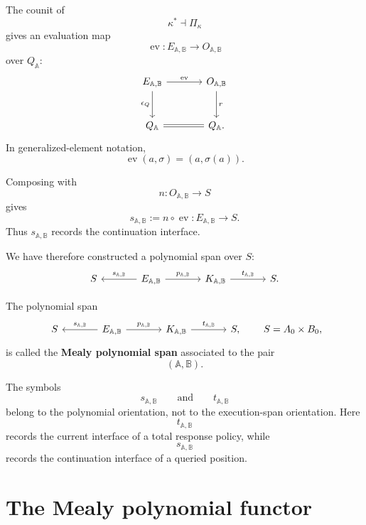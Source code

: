 The counit of
\[
\kappa^\ast\dashv\Pi_\kappa
\]
gives an evaluation map
\[
\operatorname{ev}:E_{\mathbb A,\mathbb B}\to O_{\mathbb A,\mathbb B}
\]
over \(Q_{\mathbb A}\):
\[
\begin{tikzcd}[column sep=large,row sep=large]
E_{\mathbb A,\mathbb B}
  \arrow[r, "\operatorname{ev}"]
  \arrow[d, "\epsilon_Q"']
&
O_{\mathbb A,\mathbb B}
  \arrow[d, "r"]
\\
Q_{\mathbb A}
  \arrow[r, equal]
&
Q_{\mathbb A}.
\end{tikzcd}
\]
In generalized-element notation,
\[
\operatorname{ev}(a,\sigma)=(a,\sigma(a)).
\]

Composing with
\[
n:O_{\mathbb A,\mathbb B}\to S
\]
gives
\[
s_{\mathbb A,\mathbb B}
:=
n\circ\operatorname{ev}
:
E_{\mathbb A,\mathbb B}\to S.
\]
Thus \(s_{\mathbb A,\mathbb B}\) records the continuation interface.

We have therefore constructed a polynomial span over \(S\):
\[
\begin{tikzcd}[column sep=large]
S
&
E_{\mathbb A,\mathbb B}
  \arrow[l, "s_{\mathbb A,\mathbb B}"']
  \arrow[r, "p_{\mathbb A,\mathbb B}"]
&
K_{\mathbb A,\mathbb B}
  \arrow[r, "t_{\mathbb A,\mathbb B}"]
&
S .
\end{tikzcd}
\]

\begin{definition}
\label{def:mealy-polynomial-span}
The polynomial span
\[
\begin{tikzcd}[column sep=large]
S
&
E_{\mathbb A,\mathbb B}
  \arrow[l, "s_{\mathbb A,\mathbb B}"']
  \arrow[r, "p_{\mathbb A,\mathbb B}"]
&
K_{\mathbb A,\mathbb B}
  \arrow[r, "t_{\mathbb A,\mathbb B}"]
&
S ,
\end{tikzcd}
\qquad
S=A_0\times B_0,
\]
is called the \textbf{Mealy polynomial span} associated to the pair
\[
(\mathbb A,\mathbb B).
\]
\end{definition}

\begin{remark}
\label{rem:polynomial-orientation-mealy}
The symbols
\[
s_{\mathbb A,\mathbb B}
\qquad\text{and}\qquad
t_{\mathbb A,\mathbb B}
\]
belong to the polynomial orientation, not to the execution-span
orientation. Here
\[
t_{\mathbb A,\mathbb B}
\]
records the current interface of a total response policy, while
\[
s_{\mathbb A,\mathbb B}
\]
records the continuation interface of a queried position.
\end{remark}

\section{The Mealy polynomial functor}
\label{sec:mealy-polynomial-functor}

